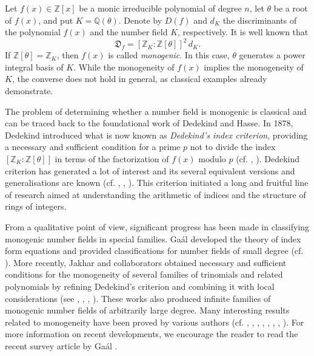 \documentclass[table]{amsart}
\newcommand{\D}{\mathfrak{D}}
\numberwithin{equation}{section}
\begin{document}
Let $f(x)\in\mathbb{Z}[x]$ be a monic irreducible polynomial of degree $n$, let $\theta$ be a root of $f(x)$, and put $K=\mathbb{Q}(\theta)$.
Denote by $D(f)$ and $d_K$ the discriminants of the polynomial $f(x)$ and the number field $K$, respectively.
It is well known that
\begin{equation}\label{eq:disc-relation}
\D _f=[\mathbb{Z}_K:\mathbb{Z}[\theta]]^2\, d_K.
\end{equation}
If $\mathbb{Z}[\theta]=\mathbb{Z}_K$, then $f(x)$ is called \emph{monogenic}.
In this case, $\theta$ generates a power integral basis of $K$.
While the monogeneity of $f(x)$ implies the monogeneity of $K$, the converse does not hold in general, as classical examples already demonstrate.

The problem of determining whether a number field is monogenic is classical and can be traced back to the foundational work of Dedekind and Hasse.
In 1878, Dedekind introduced what is now known as \emph{Dedekind’s index criterion}, providing a necessary and sufficient condition for a prime $p$ not to divide the index $[\mathbb{Z}_K:\mathbb{Z}[\theta]]$ in terms of the factorization of $f(x)$ modulo $p$ (cf. \cite[Theorem 6.1.4]{HC}, \cite{RD1878}). Dedekind criterion has generated a lot of interest and its several equivalent versions and generalisations are known (cf. \cite{MEC}, \cite{JNT}, \cite{Jh-Kh}). 
This criterion initiated a long and fruitful line of research aimed at understanding the arithmetic of indices and the structure of rings of integers.

From a qualitative point of view, significant progress has been made in classifying monogenic number fields in special families.
Ga\'al developed the theory of index form equations and provided classifications for number fields of small degree (cf. \cite{Gaal}).
More recently, Jakhar and collaborators obtained necessary and sufficient conditions for the monogeneity of several families of trinomials and related polynomials by refining Dedekind’s criterion and combining it with local considerations (see \cite{JNT}, \cite{jKN}, \cite{J-K-K}, \cite{J-K-Y}). These works also produced infinite families of monogenic number fields of arbitrarily large degree. Many interesting results related to monogeneity have been proved by various authors (cf. \cite{Jones}, \cite{JonesHarr}, \cite{J-K-Y}, \cite{BNW2025}, \cite{S-L-S}, \cite{Smith2021}, \cite{GR2017}, \cite{KKR}). For more information on recent developments, we encourage the reader to read the recent survey article by Ga\'{a}l \cite{Gaal}.
\end{document}
